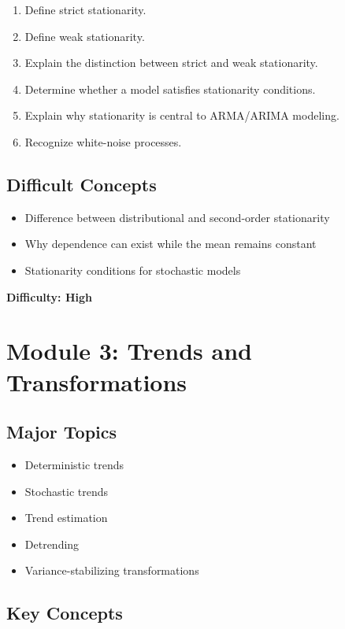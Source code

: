\documentclass[11pt]{article}
\begin{document}
\begin{enumerate}
    \item Define strict stationarity.
    \item Define weak stationarity.
    \item Explain the distinction between strict and weak stationarity.
    \item Determine whether a model satisfies stationarity conditions.
    \item Explain why stationarity is central to ARMA/ARIMA modeling.
    \item Recognize white-noise processes.
\end{enumerate}

\subsection{Difficult Concepts}

\begin{itemize}
    \item Difference between distributional and second-order stationarity
    \item Why dependence can exist while the mean remains constant
    \item Stationarity conditions for stochastic models
\end{itemize}

\textbf{Difficulty: High}

\section{Module 3: Trends and Transformations}

\subsection{Major Topics}

\begin{itemize}
    \item Deterministic trends
    \item Stochastic trends
    \item Trend estimation
    \item Detrending
    \item Variance-stabilizing transformations
\end{itemize}

\subsection{Key Concepts}
\end{document}
